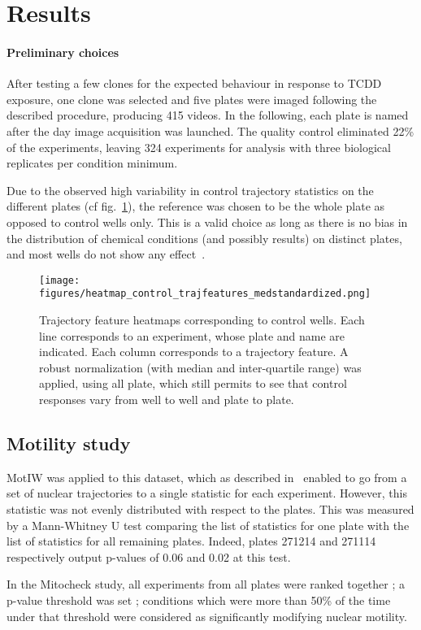 \section{Results}
\paragraph{Preliminary choices}
After testing a few clones for the expected behaviour in response to TCDD exposure, one clone was selected and five plates were imaged following the described procedure, producing 415 videos. In the following, each plate is named after the day image acquisition was launched. The quality control eliminated 22\% of the experiments, leaving 324 experiments for analysis with three biological replicates per condition minimum.

Due to the observed high variability in control trajectory statistics on the different plates (cf fig.~\ref{control_heatmap}), the reference was chosen to be the whole plate as opposed to control wells only. This is a valid choice as long as there is no bias in the distribution of chemical conditions (and possibly results) on distinct plates, and most wells do not show any effect~\cite{pmid19644458}. 
\begin{figure}
\centering
\texttt{[image: figures/heatmap\_control\_trajfeatures\_medstandardized.png]}
\caption{Trajectory feature heatmaps corresponding to control wells. Each line corresponds to an experiment, whose plate and name are indicated. Each column corresponds to a trajectory feature. A robust normalization (with median and inter-quartile range) was applied, using all plate, which still permits to see that control responses vary from well to well and plate to plate.}
\label{control_heatmap}
\end{figure}

\subsection{Motility study}
MotIW was applied to this dataset, which as described in~\cite{motiw} enabled to go from a set of nuclear trajectories to a single statistic for each experiment. However, this statistic was not evenly distributed with respect to the plates. This was measured by a Mann-Whitney U test comparing the list of statistics for one plate with the list of statistics for all remaining plates. Indeed, plates 271214 and 271114 respectively output p-values of 0.06 and 0.02 at this test.

In the Mitocheck study, all experiments from all plates were ranked together ; a p-value threshold was set ; conditions which were more than 50\% of the time under that threshold were considered as significantly modifying nuclear motility. 

